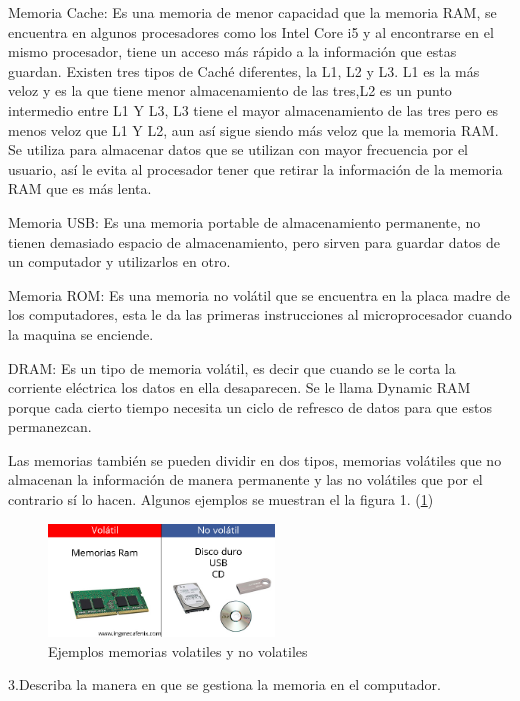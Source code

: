 \documentclass{article}
\begin{document}
Memoria Cache: Es una memoria de menor capacidad que la memoria RAM, se encuentra en algunos procesadores como los Intel Core i5 y al encontrarse en el mismo procesador, tiene un acceso más rápido a la información que estas guardan. Existen tres tipos de Caché diferentes, la L1, L2 y L3. L1 es la más veloz y es la que tiene menor almacenamiento de las tres,L2 es un punto intermedio entre L1 Y L3, L3 tiene el mayor almacenamiento de las tres pero es menos veloz que L1 Y L2, aun así sigue siendo más veloz que la memoria RAM. Se utiliza para almacenar datos que se utilizan con mayor frecuencia por el usuario, así le evita al procesador tener que retirar la información de la memoria RAM que es más lenta.\cite{YouBioit}

Memoria USB: Es una memoria portable de almacenamiento permanente, no tienen demasiado espacio de almacenamiento, pero sirven para guardar datos de un computador y utilizarlos en otro.

Memoria ROM: Es una memoria no volátil que se encuentra en la placa madre de los computadores, esta le da las primeras instrucciones al microprocesador cuando la maquina se enciende.

DRAM: Es un tipo de memoria volátil, es decir que cuando se le corta la corriente eléctrica los datos en ella desaparecen. Se le llama Dynamic RAM porque cada cierto tiempo necesita un ciclo de refresco de datos para que estos permanezcan.

Las memorias también se pueden dividir en dos tipos, memorias volátiles que no almacenan la información de manera permanente y las no volátiles que por el contrario sí lo hacen. Algunos ejemplos se muestran el la figura 1. (\ref{fig:Volatilidad})

\begin{figure}[h]
\includegraphics[width=6cm]{Volatilidad.jpg}
\centering
\caption{Ejemplos memorias volatiles y no volatiles}
\label{fig:Volatilidad}
\end{figure}


3.Describa la manera en que se gestiona la memoria en el computador.
\end{document}

